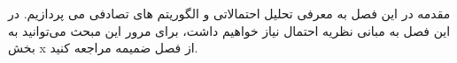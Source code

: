 \begin{itemframe}{مقدمه}
\itm
در این فصل به معرفی تحلیل احتمالاتی و الگوریتم های تصادفی می پردازیم.
\itm
در این فصل به مبانی نظریه احتمال نیاز خواهیم داشت، برای مرور این مبحث می‌توانید به بخش x
از فصل ضمیمه مراجعه کنید.

\end{itemframe}